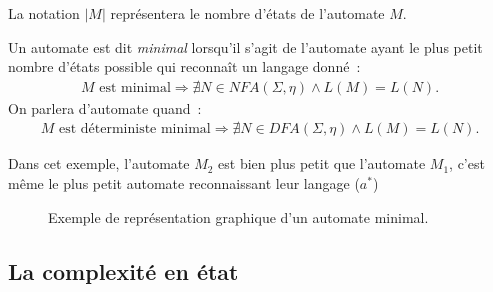 \begin{remark}
  La notation \(\lvert M \rvert\) représentera le nombre d'états de l'automate
  \(M\).
\end{remark}

\begin{definition}
  Un automate est dit \textit{minimal} lorsqu’il s’agit de l’automate ayant le
  plus petit nombre d’états possible qui reconnaît un langage donné~:
  \begin{align*}
    M \text{ est minimal} \Longrightarrow \nexists N \in NFA(\Sigma, \eta)
    \land L(M) = L(N).
  \end{align*}
  On parlera d'automate  quand~:
    \begin{align*}
    M \text{ est déterministe minimal} \Longrightarrow \nexists N \in 
    DFA(\Sigma, \eta) \land L(M) = L(N).
  \end{align*}
\end{definition}

\begin{example}
  Dans cet exemple, l'automate \(M_2\) est bien plus petit que l'automate
  \(M_1\), c'est même le plus petit automate reconnaissant leur langage
  (\(a^*\))
  \begin{figure}[H]
    \centering
    \captionsetup{type=figure,justification=centering}
    \caption{
      Exemple de représentation graphique d'un automate minimal.
    }\label{fig:ex_minimal}
  \end{figure}
\end{example}

\subsection{La complexité en état}

